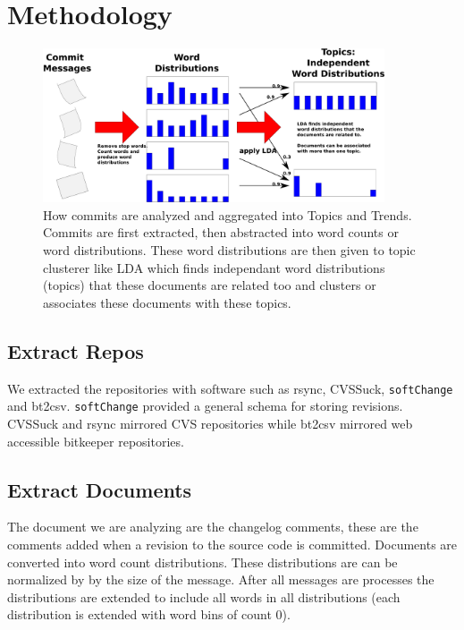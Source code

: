 \documentclass[times, 10pt,twocolumn]{article}
\begin{document}
\section{Methodology}
\begin{figure}
  \centering
  \includegraphics[width=0.9\textwidth]{commit-to-topics} 
  \caption{How commits are analyzed and aggregated into Topics and Trends. Commits are first extracted, then abstracted into word counts or word distributions. These word distributions are then given to topic clusterer like LDA which finds independant word distributions (topics) that these documents are related too and clusters or associates these documents with these topics.}
  \label{fig:commits}
\end{figure}



\subsection{Extract Repos}

We extracted the repositories with software such as rsync, CVSSuck,
\texttt{softChange} and bt2csv.  \texttt{softChange} provided a
general schema for storing revisions. CVSSuck and rsync mirrored CVS
repositories while bt2csv mirrored web accessible bitkeeper
repositories.


\subsection{Extract Documents}

The document we are analyzing are the changelog comments, these are
the comments added when a revision to the source code is committed.
Documents are converted into word count distributions. These
distributions are can be normalized by by the size of the
message. After all messages are processes the distributions are
extended to include all words in all distributions (each distribution
is extended with word bins of count 0).
\end{document}
